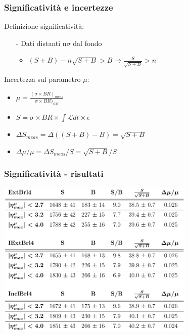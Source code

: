 \documentclass{beamer}
\begin{document}

\begin{frame}
\frametitle{Significativit\`a e incertezze }

Definizione significativit\`a:\\
\begin{itemize}
\item[\color{black}-] Dati distanti n$\sigma$ dal fondo
	\begin{itemize}
	\item $(S + B) - n\sqrt{S + B} > B \rightarrow \frac{S}{\sqrt{S+B}} > n$
	\end{itemize}		
\end{itemize}

\bigskip
\bigskip

Incertezza sul parametro $\mu$:
\begin{itemize}
\item $\mu = \frac{(\sigma \times BR)_{meas}}{\sigma \times BR)_{SM}}$
\item $S = \sigma \times BR \times \int\mathcal{L}dt \times \epsilon$
\item $\Delta S_{meas} = \Delta((S + B) - B) = \sqrt{S + B}$
\item $\Delta\mu/\mu = \Delta S_{meas}/ S = \sqrt{S+B}/S$
\end{itemize}

\end{frame}



\begin{frame}
\frametitle{Significativit\`a - risultati}
\centering
\includegraphics[width=.9\textwidth, height=7.5cm]{significance}
\end{frame}
\end{document}

